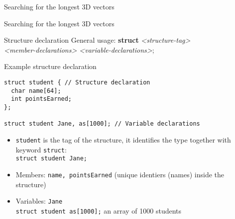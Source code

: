\documentclass[usenames,dvipsnames,aspectratio=169]{beamer}
\begin{document}
\begin{frame}{Searching for the longest 3D vectors}
  \begin{exampleblock}{}
    \scriptsize
    
  \end{exampleblock}
\end{frame}

\begin{frame}{Searching for the longest 3D vectors}
  \begin{exampleblock}{}
    \scriptsize
    
  \end{exampleblock}
\end{frame}

\begin{frame}[fragile]{Structure declaration}
  \footnotesize
  General usage: \textbf{struct} \emph{{<}structure-tag>}\\
      \qquad \emph{{<}{member-declarations}> <variable-declarations>};
  \begin{exampleblock}{Example structure declaration}
    \begin{verbatim}
struct student { // Structure declaration
  char name[64];
  int pointsEarned;
};

struct student Jane, as[1000]; // Variable declarations
\end{verbatim}
  \end{exampleblock}
  \begin{itemize}
    \item \texttt{student} is the tag of the structure, it identifies the type together with keyword \texttt{struct}:\\
      \texttt{struct student Jane;}
    \item Members: \texttt{name, pointsEarned} (unique identiers (names) inside the structure)
    \item Variables: \texttt{Jane}\\ 
      \texttt{struct student as[1000];} an array of 1000 students
  \end{itemize}
\end{frame}
\end{document}
